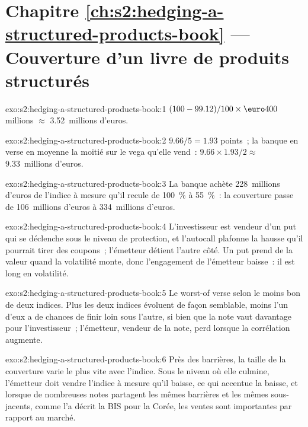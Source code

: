 \section*{Chapitre \ref{ch:s2:hedging-a-structured-products-book} --- Couverture d'un livre de produits structurés}

\begin{solution}{exo:s2:hedging-a-structured-products-book:1}
$(100 - 99.12)/100 \times \text{\euro}400$ millions $\approx$ 3.52~millions d'euros.
\end{solution}

\begin{solution}{exo:s2:hedging-a-structured-products-book:2}
$9.66 / 5 = 1.93$ points~; la banque en verse en moyenne la moitié sur le vega qu'elle vend~: $9.66 \times 1.93 / 2 \approx$ 9.33~millions d'euros.
\end{solution}

\begin{solution}{exo:s2:hedging-a-structured-products-book:3}
La banque achète 228~millions d'euros de l'indice à mesure qu'il recule de 100~\% à 55~\%~: la couverture passe de 106~millions d'euros à 334~millions d'euros.
\end{solution}

\begin{solution}{exo:s2:hedging-a-structured-products-book:4}
L'investisseur est vendeur d'un put qui se déclenche sous le niveau de protection, et l'autocall plafonne la hausse qu'il pourrait tirer des coupons~; l'émetteur détient
l'autre côté. Un put prend de la valeur quand la volatilité monte, donc l'engagement de l'émetteur baisse~: il est long en volatilité.
\end{solution}

\begin{solution}{exo:s2:hedging-a-structured-products-book:5}
Le worst-of verse selon le moins bon de deux indices. Plus les deux indices évoluent de façon semblable, moins l'un d'eux a de chances de finir loin sous l'autre, si bien que la
note vaut davantage pour l'investisseur~; l'émetteur, vendeur de la note, perd lorsque la corrélation augmente.
\end{solution}

\begin{solution}{exo:s2:hedging-a-structured-products-book:6}
Près des barrières, la taille de la couverture varie le plus vite avec l'indice. Sous le niveau où elle culmine, l'émetteur doit vendre l'indice à mesure qu'il baisse, ce qui accentue
la baisse, et lorsque de nombreuses notes partagent les mêmes barrières et les mêmes sous-jacents, comme l'a décrit la BIS pour la Corée, les ventes sont importantes par rapport au marché.
\end{solution}

